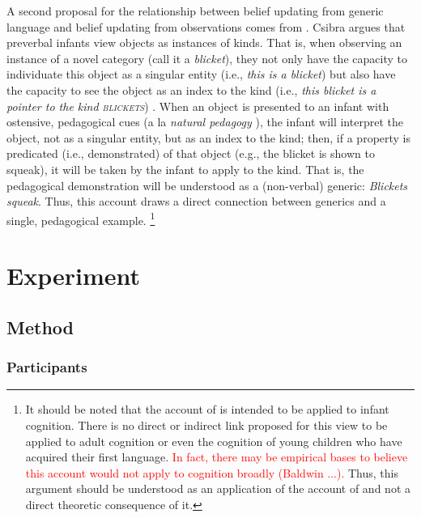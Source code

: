 \documentclass[10pt,letterpaper]{article}
\newcommand{\red}[1]{\textcolor{Red}{#1}}
\begin{document}
A second proposal for the relationship between belief updating from generic language and belief updating from observations comes from . Csibra argues that preverbal infants view objects as instances of kinds. That is, when observing an instance of a novel category (call it a \emph{blicket}), they not only have the capacity to individuate this object as a singular entity (i.e., \emph{this is a blicket}) but also have the capacity to see the object as an index to the kind (i.e., \emph{this blicket is a pointer to the kind \textsc{blickets}}) .  When an object is presented to an infant with ostensive, pedagogical cues (a la \emph{natural pedagogy} \cite{CsibraGereley}), the infant will interpret the object, not as a singular entity, but as an index to the kind; then, if a property is predicated (i.e., demonstrated) of that object (e.g., the blicket is shown to squeak), it will be taken by the infant to apply to the kind. That is, the pedagogical demonstration will be understood as a (non-verbal) generic: \emph{Blickets squeak}. Thus, this account draws a direct connection between generics and a single, pedagogical example. \footnote{It should be noted that the account of  is intended to be applied to infant cognition. There is no direct or indirect link proposed for this view to be applied to adult cognition or even the cognition of young children who have acquired their first language. \red{In fact, there may be empirical bases to believe this account would not apply to cognition broadly (Baldwin ...).} Thus, this argument should be understood as an application of the account of  and not a direct theoretic consequence of it.} 

\section{Experiment}

\subsection{Method}

\subsubsection{Participants}
\end{document}
